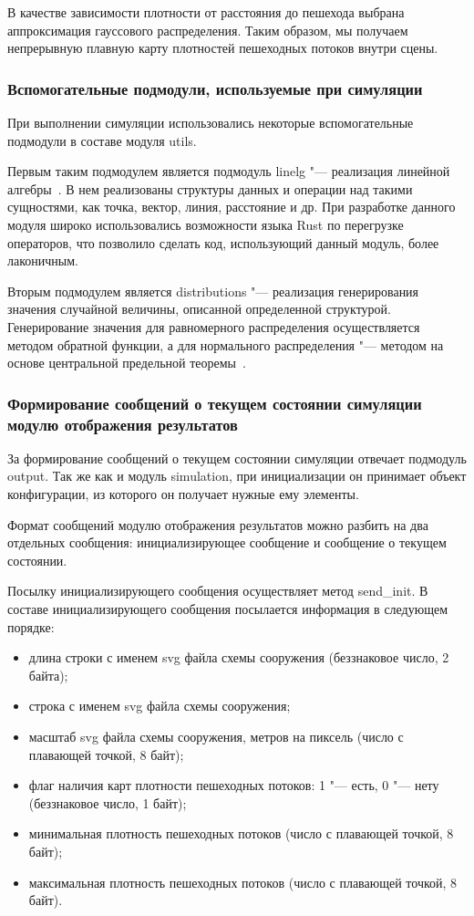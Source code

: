 В качестве зависимости плотности от расстояния до пешехода выбрана аппроксимация гауссового распределения.
Таким образом, мы получаем непрерывную плавную карту плотностей пешеходных потоков внутри сцены.

\subsubsection{Вспомогательные подмодули, используемые при симуляции}
\label{sec:development:core:utils}

При выполнении симуляции использовались некоторые вспомогательные подмодули в составе модуля utils.

Первым таким подмодулем является подмодуль linelg "--- реализация линейной алгебры~\cite{linelg_book}.
В нем реализованы структуры данных и операции над такими сущностями, как точка, вектор, линия, расстояние и др.
При разработке данного модуля широко использовались возможности языка Rust по перегрузке операторов,
что позволило сделать код, использующий данный модуль, более лаконичным.

Вторым подмодулем является distributions "--- реализация генерирования значения случайной величины, описанной определенной структурой.
Генерирование значения для равномерного распределения осуществляется методом обратной функции,
а для нормального распределения "--- методом на основе центральной предельной теоремы~\cite{probability_modeling}.

\subsubsection{Формирование сообщений о текущем состоянии симуляции модулю отображения результатов}
\label{sec:development:core:output}

За формирование сообщений о текущем состоянии симуляции отвечает подмодуль output.
Так же как и модуль simulation, при инициализации он принимает объект конфигурации, из которого он получает нужные ему элементы.

Формат сообщений модулю отображения результатов можно разбить на два отдельных сообщения: инициализирующее сообщение и сообщение о текущем состоянии.

Посылку инициализирующего сообщения осуществляет метод se\-nd\_in\-it.
В составе инициализирующего сообщения посылается информация в следующем порядке:
\begin{itemize}
  \item длина строки с именем svg файла схемы сооружения (беззнаковое число, 2 байта);
  \item строка с именем svg файла схемы сооружения;
  \item масштаб svg файла схемы сооружения, метров на пиксель (число с плавающей точкой, 8 байт);
  \item флаг наличия карт плотности пешеходных потоков: 1 "--- есть, 0 "--- нету (беззнаковое число, 1 байт);
  \item минимальная плотность пешеходных потоков (число с плавающей точкой, 8 байт);
  \item максимальная плотность пешеходных потоков (число с плавающей точкой, 8 байт).
\end{itemize}

